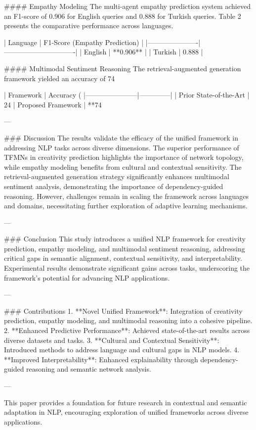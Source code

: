 #### Empathy Modeling  
The multi-agent empathy prediction system achieved an F1-score of 0.906 for English queries and 0.888 for Turkish queries. Table 2 presents the comparative performance across languages.

| Language             | F1-Score (Empathy Prediction) |  
|----------------------|-------------------------------|  
| English              | **0.906**                   |  
| Turkish              | 0.888                       |  

#### Multimodal Sentiment Reasoning  
The retrieval-augmented generation framework yielded an accuracy of 74%

| Framework            | Accuracy (%
|-----------------------|--------------|  
| Prior State-of-the-Art | 24%
| Proposed Framework   | **74%

---

### Discussion  
The results validate the efficacy of the unified framework in addressing NLP tasks across diverse dimensions. The superior performance of TFMNs in creativity prediction highlights the importance of network topology, while empathy modeling benefits from cultural and contextual sensitivity. The retrieval-augmented generation strategy significantly enhances multimodal sentiment analysis, demonstrating the importance of dependency-guided reasoning. However, challenges remain in scaling the framework across languages and domains, necessitating further exploration of adaptive learning mechanisms.

---

### Conclusion  
This study introduces a unified NLP framework for creativity prediction, empathy modeling, and multimodal sentiment reasoning, addressing critical gaps in semantic alignment, contextual sensitivity, and interpretability. Experimental results demonstrate significant gains across tasks, underscoring the framework's potential for advancing NLP applications.

---

### Contributions  
1. **Novel Unified Framework**: Integration of creativity prediction, empathy modeling, and multimodal reasoning into a cohesive pipeline.
2. **Enhanced Predictive Performance**: Achieved state-of-the-art results across diverse datasets and tasks.
3. **Cultural and Contextual Sensitivity**: Introduced methods to address language and cultural gaps in NLP models.
4. **Improved Interpretability**: Enhanced explainability through dependency-guided reasoning and semantic network analysis.

---

This paper provides a foundation for future research in contextual and semantic adaptation in NLP, encouraging exploration of unified frameworks across diverse applications.